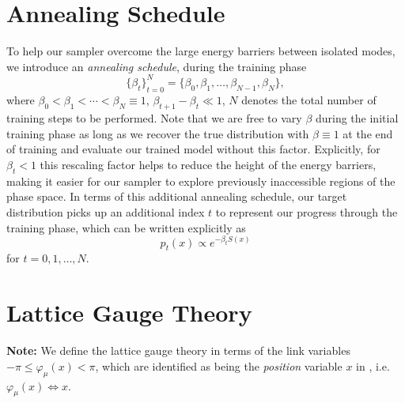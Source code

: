 \documentclass{article} %
\begin{document}
\section{\label{sec:annealing_schedule}Annealing Schedule}
%
To help our sampler overcome the large energy barriers between isolated modes, we introduce an \emph{annealing
schedule}, during the training phase
%
\begin{equation}
   {\{\beta_{t}\}}_{t=0}^{N} = \{\beta_{0}, \beta_{1}, \ldots, \beta_{N-1}, \beta_{N}\},
\end{equation}
%
where \(\beta_{0} < \beta_{1} < \cdots < \beta_{N} \equiv 1\), \(\beta_{t+1} - \beta_{t} \ll 1\), \(N\) denotes the
total number of training steps to be performed.
%
Note that we are free to vary \(\beta\) during the initial training phase as long as we recover the true distribution
with \(\beta \equiv 1\) at the end of training and evaluate our trained model without this factor.
%
Explicitly, for \(\beta_{t} < 1\) this rescaling factor helps to reduce the height of the energy barriers, making it
easier for our sampler to explore previously inaccessible regions of the phase space.
%
In terms of this additional annealing schedule, our target distribution picks up an additional index \(t\) to represent
our progress through the training phase, which can be written explicitly as  
%
\begin{equation}
   p_{t}(x)\propto e^{-\beta_{t} S(x)}
\end{equation}
%
for \(t = 0, 1, \ldots, N\).

\section{\label{sec:lattice_gauge_theory}Lattice Gauge Theory}
%
\textbf{Note:} We define the lattice gauge theory in terms of the link variables \(-\pi \leq \varphi_{\mu}(x) < \pi\), which are identified as
being the \emph{position} variable \(x\) in , i.e.\@ \(\varphi_{\mu}(x) \Longleftrightarrow x\).
%
\end{document}
